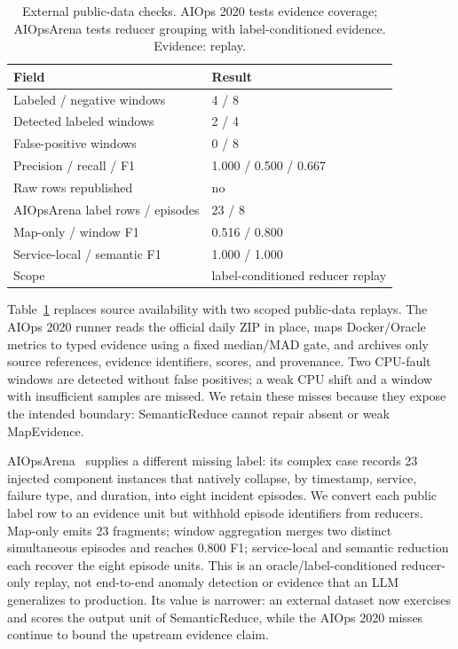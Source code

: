 \documentclass[sigplan,anonymous,nonacm]{acmart}
\begin{document}
\begin{table}[t]
\caption{External public-data checks. AIOps 2020 tests evidence coverage; AIOpsArena tests reducer grouping with label-conditioned evidence. Evidence: replay.}
\label{tab:public-replay}
\centering
\normalsize
\begin{tabular}{@{}p{}p{}@{}}
\toprule
Field & Result \\
\midrule
Labeled / negative windows & 4 / 8 \\
Detected labeled windows & 2 / 4 \\
False-positive windows & 0 / 8 \\
Precision / recall / F1 & 1.000 / 0.500 / 0.667 \\
Raw rows republished & no \\
\midrule
AIOpsArena label rows / episodes & 23 / 8 \\
Map-only / window F1 & 0.516 / 0.800 \\
Service-local / semantic F1 & 1.000 / 1.000 \\
Scope & label-conditioned reducer replay \\
\bottomrule
\end{tabular}
\end{table}

Table~\ref{tab:public-replay} replaces source availability with two scoped public-data replays. The AIOps 2020 runner reads the official daily ZIP in place, maps Docker/Oracle metrics to typed evidence using a fixed median/MAD gate, and archives only source references, evidence identifiers, scores, and provenance. Two CPU-fault windows are detected without false positives; a weak CPU shift and a window with insufficient samples are missed. We retain these misses because they expose the intended boundary: \textsf{SemanticReduce} cannot repair absent or weak \textsf{MapEvidence}.

AIOpsArena~\cite{aiopsarena2024dataset} supplies a different missing label: its complex case records 23 injected component instances that natively collapse, by timestamp, service, failure type, and duration, into eight incident episodes. We convert each public label row to an evidence unit but withhold episode identifiers from reducers. Map-only emits 23 fragments; window aggregation merges two distinct simultaneous episodes and reaches 0.800 F1; service-local and semantic reduction each recover the eight episode units. This is an oracle/label-conditioned reducer-only replay, not end-to-end anomaly detection or evidence that an LLM generalizes to production. Its value is narrower: an external dataset now exercises and scores the output unit of \textsf{SemanticReduce}, while the AIOps 2020 misses continue to bound the upstream evidence claim.
\end{document}
